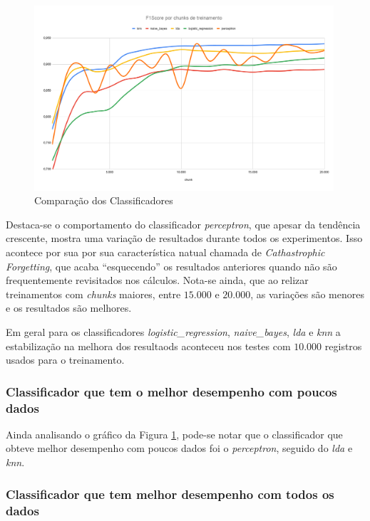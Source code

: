 \documentclass[12pt]{article}
\begin{document}
\begin{figure}[!htb]
  \centering
  \includegraphics[width=30em]{images/image_comparacao_classificadores.png}
  \caption{Comparação dos Classificadores}
  \label{fig:comparacao_classificadores}
\end{figure}

Destaca-se o comportamento do classificador \textit{perceptron}, que apesar da tendência crescente, mostra uma variação de resultados durante todos os experimentos. Isso acontece por sua por sua característica natual chamada de \textit{Cathastrophic Forgetting}, que acaba ``esquecendo'' os resultados anteriores quando não são frequentemente revisitados nos cálculos. Nota-se ainda, que ao relizar treinamentos com \textit{chunks} maiores, entre $15.000$ e $20.000$, as variações são menores e os resultados são melhores.

Em geral para os classificadores \textit{logistic\_regression}, \textit{naive\_bayes}, \textit{lda} e \textit{knn} a estabilização na melhora dos resultaods aconteceu nos testes com $10.000$ registros usados para o treinamento.

\subsubsection{Classificador que tem o melhor desempenho com poucos dados}

Ainda analisando o gráfico da Figura \ref{fig:comparacao_classificadores}, pode-se notar que o classificador que obteve melhor desempenho com poucos dados foi o \textit{perceptron}, seguido do \textit{lda} e \textit{knn}.

\subsubsection{Classificador que tem melhor desempenho com todos os dados}
\end{document}
